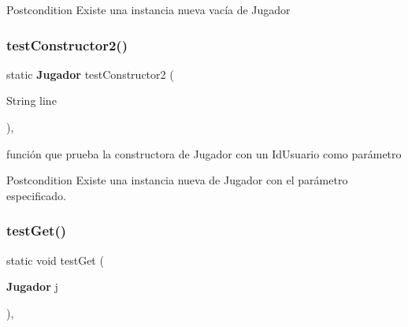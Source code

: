 \begin{DoxyPostcond}{Postcondition}
Existe una instancia nueva vacía de Jugador 
\end{DoxyPostcond}
\mbox{\label{class_dominio_1_1controladores_1_1_drivers_1_1_driver_jugador_a6d0b8a743c976500619c5df0bf02db62}} 
\subsubsection{test\+Constructor2()}
{\footnotesize\ttfamily static \textbf{ Jugador} test\+Constructor2 (\begin{DoxyParamCaption}\item[{String}]{line }\end{DoxyParamCaption})\hspace{0.3cm}{\ttfamily [inline]}, {\ttfamily [static]}}



función que prueba la constructora de Jugador con un Id\+Usuario como parámetro 

\begin{DoxyPostcond}{Postcondition}
Existe una instancia nueva de Jugador con el parámetro especificado. 
\end{DoxyPostcond}
\mbox{\label{class_dominio_1_1controladores_1_1_drivers_1_1_driver_jugador_a834a6d59c57339e96ec2839626a4b799}} 
\subsubsection{test\+Get()}
{\footnotesize\ttfamily static void test\+Get (\begin{DoxyParamCaption}\item[{\textbf{ Jugador}}]{j }\end{DoxyParamCaption})\hspace{0.3cm}{\ttfamily [inline]}, {\ttfamily [static]}}



